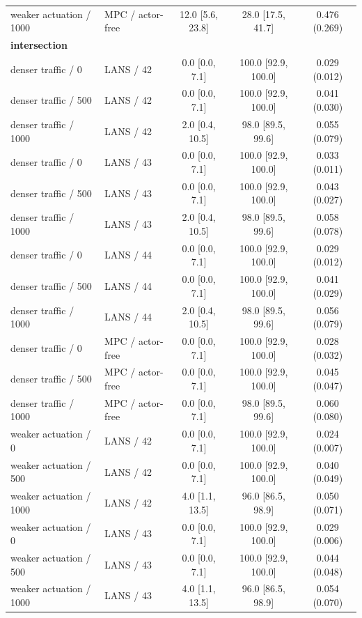 \begin{longtable}{llccc}
weaker actuation / 1000 & MPC / actor-free & 12.0 [5.6, 23.8] & 28.0 [17.5, 41.7] & 0.476 (0.269) \\
\multicolumn{5}{l}{\textbf{intersection}} \\
denser traffic / 0 & LANS / 42 & 0.0 [0.0, 7.1] & 100.0 [92.9, 100.0] & 0.029 (0.012) \\
denser traffic / 500 & LANS / 42 & 0.0 [0.0, 7.1] & 100.0 [92.9, 100.0] & 0.041 (0.030) \\
denser traffic / 1000 & LANS / 42 & 2.0 [0.4, 10.5] & 98.0 [89.5, 99.6] & 0.055 (0.079) \\
denser traffic / 0 & LANS / 43 & 0.0 [0.0, 7.1] & 100.0 [92.9, 100.0] & 0.033 (0.011) \\
denser traffic / 500 & LANS / 43 & 0.0 [0.0, 7.1] & 100.0 [92.9, 100.0] & 0.043 (0.027) \\
denser traffic / 1000 & LANS / 43 & 2.0 [0.4, 10.5] & 98.0 [89.5, 99.6] & 0.058 (0.078) \\
denser traffic / 0 & LANS / 44 & 0.0 [0.0, 7.1] & 100.0 [92.9, 100.0] & 0.029 (0.012) \\
denser traffic / 500 & LANS / 44 & 0.0 [0.0, 7.1] & 100.0 [92.9, 100.0] & 0.041 (0.029) \\
denser traffic / 1000 & LANS / 44 & 2.0 [0.4, 10.5] & 98.0 [89.5, 99.6] & 0.056 (0.079) \\
denser traffic / 0 & MPC / actor-free & 0.0 [0.0, 7.1] & 100.0 [92.9, 100.0] & 0.028 (0.032) \\
denser traffic / 500 & MPC / actor-free & 0.0 [0.0, 7.1] & 100.0 [92.9, 100.0] & 0.045 (0.047) \\
denser traffic / 1000 & MPC / actor-free & 0.0 [0.0, 7.1] & 98.0 [89.5, 99.6] & 0.060 (0.080) \\
weaker actuation / 0 & LANS / 42 & 0.0 [0.0, 7.1] & 100.0 [92.9, 100.0] & 0.024 (0.007) \\
weaker actuation / 500 & LANS / 42 & 0.0 [0.0, 7.1] & 100.0 [92.9, 100.0] & 0.040 (0.049) \\
weaker actuation / 1000 & LANS / 42 & 4.0 [1.1, 13.5] & 96.0 [86.5, 98.9] & 0.050 (0.071) \\
weaker actuation / 0 & LANS / 43 & 0.0 [0.0, 7.1] & 100.0 [92.9, 100.0] & 0.029 (0.006) \\
weaker actuation / 500 & LANS / 43 & 0.0 [0.0, 7.1] & 100.0 [92.9, 100.0] & 0.044 (0.048) \\
weaker actuation / 1000 & LANS / 43 & 4.0 [1.1, 13.5] & 96.0 [86.5, 98.9] & 0.054 (0.070) \\

\end{longtable}
